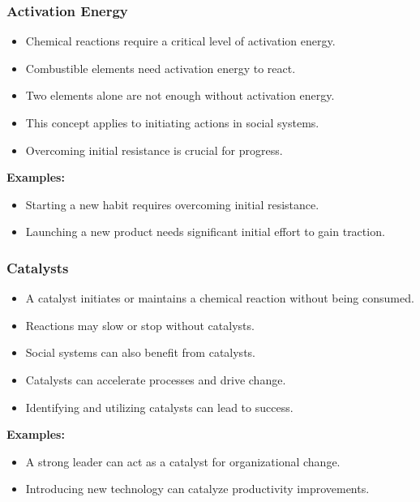 \begin{frame}[fragile]\frametitle{Activation Energy}
\begin{itemize}
    \item Chemical reactions require a critical level of activation energy.
    \item Combustible elements need activation energy to react.
    \item Two elements alone are not enough without activation energy.
    \item This concept applies to initiating actions in social systems.
    \item Overcoming initial resistance is crucial for progress.
\end{itemize}
\textbf{Examples:}
\begin{itemize}
    \item Starting a new habit requires overcoming initial resistance.
    \item Launching a new product needs significant initial effort to gain traction.
\end{itemize}
\end{frame}

\begin{frame}[fragile]\frametitle{Catalysts}
\begin{itemize}
    \item A catalyst initiates or maintains a chemical reaction without being consumed.
    \item Reactions may slow or stop without catalysts.
    \item Social systems can also benefit from catalysts.
    \item Catalysts can accelerate processes and drive change.
    \item Identifying and utilizing catalysts can lead to success.
\end{itemize}
\textbf{Examples:}
\begin{itemize}
    \item A strong leader can act as a catalyst for organizational change.
    \item Introducing new technology can catalyze productivity improvements.
\end{itemize}
\end{frame}

